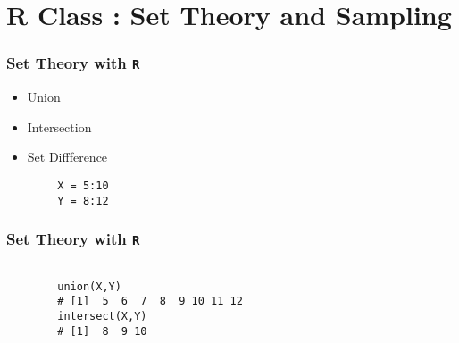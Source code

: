 \documentclass[a4paper,12pt]{article}
\begin{document}
\section{R Class : Set Theory and Sampling}


\begin{frame}[fragile] 
	\frametitle{Set Theory with \texttt{R} }
	
	\begin{itemize}
		\item Union
		\item Intersection
		\item Set Diffference
	\end{itemize}
	\begin{framed}
		\begin{verbatim}
		X = 5:10
		Y = 8:12
		\end{verbatim}
	\end{framed}
\end{frame}
\begin{frame}[fragile] 
	\frametitle{Set Theory with \texttt{R} }
	\begin{framed}
		\begin{verbatim}
		
		union(X,Y)
		# [1]  5  6  7  8  9 10 11 12
		intersect(X,Y)
		# [1]  8  9 10
		
		\end{verbatim}
	\end{framed}
\end{frame}
\end{document}
